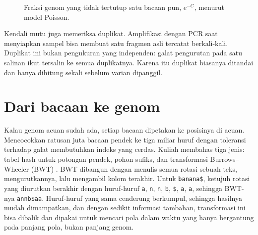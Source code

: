 \begin{figure}[ht]
\centering
{}
\caption{Fraksi genom yang tidak tertutup satu bacaan pun, $e^{-C}$, menurut model Poisson.}
\label{fig:cakupan}
\end{figure}

Kendali mutu juga memeriksa duplikat. Amplifikasi dengan PCR saat menyiapkan sampel bisa membuat satu fragmen asli tercatat
berkali-kali. Duplikat ini bukan pengukuran yang independen: galat pengurutan pada satu salinan ikut tersalin ke semua duplikatnya.
Karena itu duplikat biasanya ditandai dan hanya dihitung sekali sebelum varian dipanggil.

\section{Dari bacaan ke genom}

Kalau genom acuan sudah ada, setiap bacaan dipetakan ke posisinya di acuan. Mencocokkan ratusan juta bacaan pendek ke
tiga miliar huruf dengan toleransi terhadap galat membutuhkan indeks yang cerdas. Kuliah membahas tiga jenis: tabel hash
untuk potongan pendek, pohon sufiks, dan transformasi Burrows--Wheeler (BWT) \citep{li2009}. BWT dibangun dengan menulis
semua rotasi sebuah teks, mengurutkannya, lalu mengambil kolom terakhir. Untuk \texttt{banana\$}, ketujuh rotasi yang
diurutkan berakhir dengan huruf-huruf \texttt{a}, \texttt{n}, \texttt{n}, \texttt{b}, \texttt{\$}, \texttt{a},
\texttt{a}, sehingga BWT-nya \texttt{annb\$aa}. Huruf-huruf yang sama cenderung berkumpul, sehingga hasilnya mudah
dimampatkan, dan dengan sedikit informasi tambahan, transformasi ini bisa dibalik dan dipakai untuk mencari pola dalam
waktu yang hanya bergantung pada panjang pola, bukan panjang genom.

